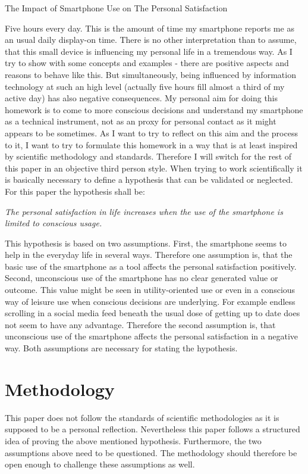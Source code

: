\headline \begin{center}
The Impact of Smartphone Use on The Personal Satisfaction
\end{center} 
\fontnormal 
Five hours every day. This is the amount of time my smartphone reports me as an usual daily display-on time. There is no other interpretation than to assume, that this small device is influencing my personal life in a tremendous way. As I try to show with some concepts and examples - there are positive aspects and reasons to behave like this. But simultaneously, being influenced by information technology at such an high level (actually five hours fill almost a third of my active day) has also negative consequences. My personal aim for doing this homework is to come to more conscious decisions and understand my smartphone as a technical instrument, not as an proxy for personal contact as it might appears to be sometimes. As I want to try to reflect on this aim and the process to it, I want to try to formulate this homework in a way that is at least inspired by scientific methodology and standards. Therefore I will switch for the rest of this paper in an objective third person style. When trying to work scientifically it is basically necessary to define a hypothesis that can be validated or neglected. For this paper the hypothesis shall be:

\begin{center}
\textit{The personal satisfaction in life increases when the use of the smartphone is limited to conscious usage.}
 \end{center}

This hypothesis is based on two assumptions. First, the smartphone seems to help in the everyday life in several ways. Therefore one assumption is, that the basic use of the smartphone as a tool affects the personal satisfaction positively. Second, unconscious use of the smartphone has no clear generated value or outcome. This value might be seen in utility-oriented use or even in a conscious way of leisure use when conscious decisions are underlying. For example endless scrolling in a social media feed beneath the usual dose of getting up to date does not seem to have any advantage. Therefore the second assumption is, that unconscious use of the smartphone affects the personal satisfaction in a negative way. Both assumptions are necessary for stating the hypothesis. 

\section*{Methodology}
This paper does not follow the standards of scientific methodologies as it is supposed to be a personal reflection. Nevertheless this paper follows a structured idea of proving the above mentioned hypothesis. Furthermore, the two assumptions above need to be questioned. The methodology should therefore be open enough to challenge these assumptions as well. 

